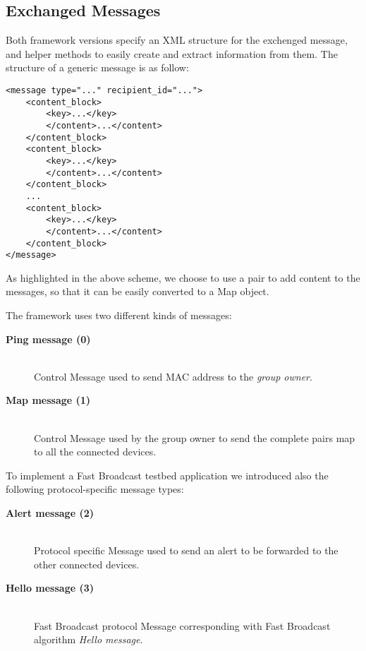 \subsection{Exchanged Messages}
Both framework versions specify an XML structure for the exchenged message, and helper methods to easily create and extract information from them. The structure of a generic message is as follow:
\begin{verbatim}
<message type="..." recipient_id="...">
    <content_block>
        <key>...</key>
        </content>...</content>
    </content_block>
    <content_block>
        <key>...</key>
        </content>...</content>
    </content_block>
    ...
    <content_block>
        <key>...</key>
        </content>...</content>
    </content_block>
</message>
\end{verbatim}
As highlighted in the above scheme, we choose to use a  pair to add content to the messages, so that it can be easily converted to a Map object.

The framework uses two different kinds of messages:
	\begin{description}
		\item[\textbf{Ping message (0)}] \hfill \\
		Control Message used to send MAC address to the \textit{group owner}.
		\item[\textbf{Map message (1)}] \hfill \\
		Control Message used by the group owner to send the complete  pairs map to all the connected devices.
	\end{description}
To implement a Fast Broadcast testbed application we introduced also the following protocol-specific message types:
	\begin{description}
		\item[\textbf{Alert message (2)}] \hfill \\
		Protocol specific Message used to send an alert to be forwarded to the other connected devices.
		\item[\textbf{Hello message (3)}] \hfill \\
		Fast Broadcast protocol Message corresponding with Fast Broadcast algorithm \textit{Hello message}.
	\end{description}

